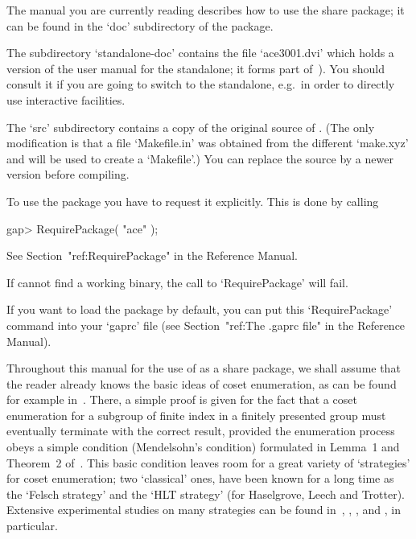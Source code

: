 The manual you are currently reading describes how to use  the  {\ACE}
share package; it can be  found  in  the  `doc'  subdirectory  of  the
package.

The  subdirectory  `standalone-doc'  contains the  file  `ace3001.dvi'
which holds a version of the user manual for the {\ACE} standalone; it
forms part of~\cite{Ram99}).  You  should consult it if  you are going
to  switch to  the {\ACE}  standalone, e.g.~in  order to  directly use
interactive facilities.

The  `src' subdirectory  contains a  copy  of the  original source  of
{\ACE}.  (The  only modification  is  that  a  file `Makefile.in'  was
obtained from  the different `make.xyz' and  will be used  to create a
`Makefile'.)  You  can replace  the source by  a newer  version before
compiling.


To use the {\ACE} package you have to request it explicitly.  This  is
done by calling

\begintt
gap> RequirePackage( "ace" );
\endtt

See Section~"ref:RequirePackage" in the {\GAP} Reference Manual.

If {\GAP} cannot find a working binary, the call  to  `RequirePackage'
will fail.

If you want to load the {\ACE} package by default, you  can  put  this
`RequirePackage' command into your `gaprc' file (see  Section~"ref:The
.gaprc file" in the {\GAP} Reference Manual).


Throughout this manual for  the  use  of  {\ACE}  as  a  {\GAP}  share
package, we shall assume that the reader already knows the basic ideas
of coset enumeration, as can be  found  for  example  in~\cite{Neu82}.
There, a simple proof is given for the fact that a  coset  enumeration
for a subgroup of finite index in  a  finitely  presented  group  must
eventually terminate with the correct result, provided the enumeration
process obeys a simple condition (Mendelsohn's  condition)  formulated
in Lemma~1 and Theorem~2 of~\cite{Neu82}. This basic condition  leaves
room for a great variety of \lq{}strategies'  for  coset  enumeration;
two \lq{}classical' ones, have been known  for  a  long  time  as  the
\lq{}Felsch strategy' and  the  \lq{}HLT  strategy'  (for  Haselgrove,
Leech and Trotter). Extensive experimental studies on many  strategies
can  be  found  in~\cite{CDHW73},  \cite{Hav91},   \cite{HR99a},   and
\cite{HR99b}, in particular.

